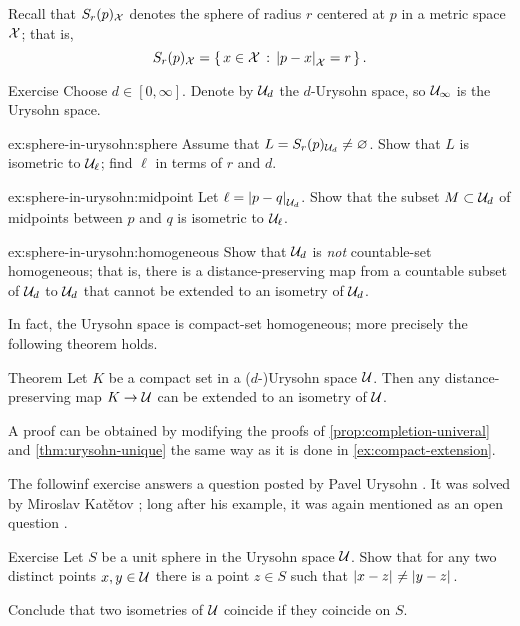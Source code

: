 Recall that $S_r(p)_{\mathcal{X}}$ denotes the sphere of radius $r$ centered at $p$ in a metric space $\mathcal{X}$;
that is, 
$$S_r(p)_{\spc{X}}=\set{x\in \spc{X}}{\dist{p}{x}{\spc{X}}=r}.$$

\begin{thm}{Exercise}\label{ex:sphere-in-urysohn}
Choose $d\in [0,\infty]$.
Denote by $\mathcal{U}_d$ the $d$-Urysohn space,
so $\mathcal{U}_\infty$ is the Urysohn space.

\begin{subthm}{ex:sphere-in-urysohn:sphere}
Assume that $L=S_r(p)_{\mathcal{U}_d}\ne \varnothing$.
Show that $L$ is isometric to $\mathcal{U}_{\ell}$; find $\ell$ in terms of $r$ and $d$.
\end{subthm}

\begin{subthm}{ex:sphere-in-urysohn:midpoint}
Let $\ell=\dist{p}{q}{\spc{U}_d}$.
Show that the subset $M\subset\mathcal{U}_d$ of midpoints between $p$ and $q$ is isometric to $\mathcal{U}_\ell$.
\end{subthm}

\begin{subthm}{ex:sphere-in-urysohn:homogeneous}
Show that $\mathcal{U}_d$ is \emph{not} countable-set homogeneous;
that is, there is a distance-preserving map from a countable subset of $\mathcal{U}_d$ to $\mathcal{U}_d$ that cannot be extended to an isometry of $\mathcal{U}_d$.
\end{subthm}

\end{thm}

In fact, the Urysohn space is compact-set homogeneous; more precisely the following theorem holds.

\begin{thm}{Theorem}\label{thm:compact-homogeneous}
Let $K$ be a compact set in a ($d$-)Urysohn space $\mathcal{U}$.
Then any distance-preserving map $K\to \mathcal{U}$ can be extended to an isometry of $\mathcal{U}$.
\end{thm}

A proof can be obtained by modifying the proofs of \ref{prop:completion-univeral} and \ref{thm:urysohn-unique}
the same way as it is done in \ref{ex:compact-extension}.

The followinf exercise answers a question posted by Pavel Urysohn \cite[§$2(6)$]{urysohn}.
It was solved by Miroslav Katětov \cite{katetov};
long after his example, it was again mentioned as an open question \cite[p. 83]{gromov-2007}.

\begin{thm}{Exercise}\label{ex:shere}
Let $S$ be a unit sphere in the Urysohn space $\mathcal{U}$.
Show that for any two distinct points $x,y\in \mathcal{U}$ there is a point $z\in S$ such that 
$\dist{x}{z}{}\ne \dist{y}{z}{}$.

Conclude that two isometries of $\mathcal{U}$ coincide if they coincide on $S$.
\end{thm}

